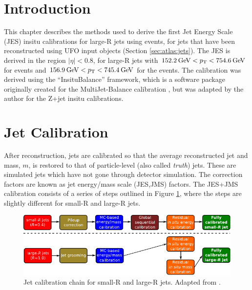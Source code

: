 \section{Introduction}
This chapter describes the methods used to derive the first Jet Energy Scale (JES) insitu calibrations for large-R jets using \zjets events, for jets that have been reconstructed using UFO input objects (Section \ref{sec:atlas:jets}). The JES is derived in the region $|\eta|<0.8$, for large-R jets with $152.2\hspace{2pt}\text{Ge\kern -0.1em V} < p_{\text{T}} < 754.6\hspace{2pt}\text{Ge\kern -0.1em V}$ for \zee events and $156.9\hspace{2pt}\text{Ge\kern -0.1em V}<p_{\text{T}}<745.4\hspace{2pt}\text{Ge\kern -0.1em V}$ for the \zmm events. The calibration was derived using the ``InsituBalance'' framework, which is a software package originally created for the MultiJet-Balance calibration \cite{Atlas:largercali}, but was adapted by the author for the Z+jet insitu calibrations.%

\section{Jet Calibration\label{sec:jetcal}}

After reconstruction, jets are calibrated so that the average reconstructed jet \pt and mass, $m$, is restored to that of particle-level (also called \textit{truth}) jets. These are simulated jets which have not gone through detector simulation. The correction factors are known as jet energy/mass scale (JES,JMS) factors. The JES+JMS calibration consists of a series of steps outlined in Figure \ref{fig:jetcali}, where the steps are slightly different for small-R and large-R jets.

\begin{figure}[t]
    \centering
    \includegraphics[width=\textwidth]{plots/atlas/calichain.pdf}
    \caption{Jet calibration chain for small-R and large-R jets. Adapted from \cite{Schramm:2017frb}.\label{fig:jetcali}}
\end{figure}

